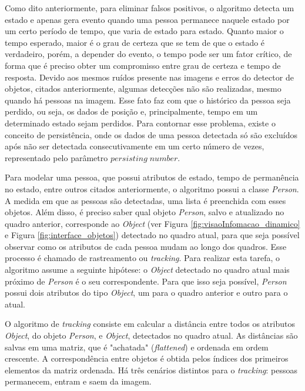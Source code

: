 \documentclass[]{politex}
\begin{document}
Como dito anteriormente, para eliminar falsos positivos, o algoritmo detecta um estado e apenas gera evento quando uma pessoa permanece naquele estado por um certo período de tempo, que varia de estado para estado. Quanto maior o tempo esperado, maior é o grau de certeza que se tem de que o estado é verdadeiro, porém, a depender do evento, o tempo pode ser um fator crítico, de forma que é preciso obter um compromisso entre grau de certeza e tempo de resposta. Devido aos mesmos ruídos presente nas imagens e erros do detector de objetos, citados anteriormente, algumas detecções não são realizadas, mesmo quando há pessoas na imagem. Esse fato faz com que o histórico da pessoa seja perdido, ou seja, os dados de posição e, principalmente, tempo em um determinado estado sejam perdidos. Para contornar esse problema, existe o conceito de persistência, onde os dados de uma pessoa detectada só são excluídos após não ser detectada consecutivamente em um certo número de vezes, representado pelo parâmetro \(persisting\;number\).

Para modelar uma pessoa, que possui atributos de estado, tempo de permanência no estado, entre outros citados anteriormente, o algoritmo possui a classe \textit{Person}. A medida em que as pessoas são detectadas, uma lista é preenchida com esses objetos. Além disso, é preciso saber qual objeto \textit{Person}, salvo e atualizado no quadro anterior, corresponde ao \textit{Object} (ver Figura  \ref{fig:visaoInfomacao_dinamico} e Figura \ref{fig:interface_objetos}) detectado no quadro atual, para que seja possível observar como os atributos de cada pessoa mudam ao longo dos quadros. Esse processo é chamado de rastreamento ou \textit{tracking}. Para realizar esta tarefa, o algoritmo assume a seguinte hipótese: o \textit{Object} detectado no quadro atual mais próximo de \textit{Person} é o seu correspondente. Para que isso seja possível, \textit{Person} possui dois atributos do tipo \textit{Object}, um para o quadro anterior e outro para o atual.

O algoritmo de \textit{tracking} consiste em calcular a distância entre todos os atributos \textit{Object}, do objeto \textit{Person}, e \textit{Object}, detectados no quadro atual. As distâncias são salvas em uma matriz, que é "achatada" (\textit{flattened}) e ordenada em ordem crescente. A correspondência entre objetos é obtida pelos índices dos primeiros elementos da matriz ordenada. Há três cenários distintos para o \textit{tracking}: pessoas permanecem, entram e saem da imagem.
\end{document}
